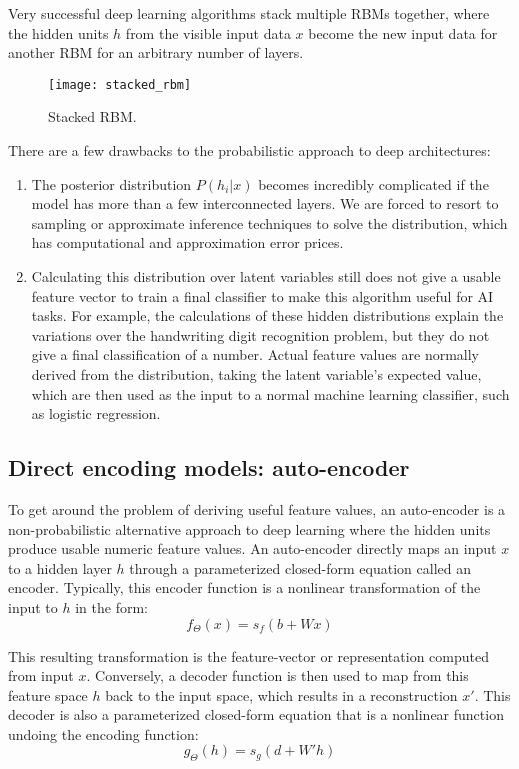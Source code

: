 Very successful deep learning algorithms stack multiple RBMs together, where the hidden units \(h\) from the visible input data \(x\) become the new input data for another RBM for an arbitrary number of layers. 

\begin{figure}[h!]
  \centering
    \texttt{[image: stacked\_rbm]}
\caption{Stacked RBM.}
\end{figure}



There are a few drawbacks to the probabilistic approach to deep architectures:
\begin{enumerate}
\item The posterior distribution \(P(h_i | x)\) becomes incredibly complicated if the model has more than a few interconnected layers. We are forced to resort to sampling or approximate inference techniques to solve the distribution, which has computational and approximation error prices.
\item Calculating this distribution over latent variables still does not give a usable feature vector to train a final classifier to make this algorithm useful for AI tasks. For example, the calculations of these hidden distributions explain the variations over the handwriting digit recognition problem, but they do not give a final classification of a number. Actual feature values are normally derived from the distribution, taking the latent variable's expected value, which are then used as the input to a normal machine learning classifier, such as logistic regression.
\end{enumerate}

\subsection{Direct encoding models: auto-encoder}
To get around the problem of deriving useful feature values, an auto-encoder is a non-probabilistic alternative approach to deep learning where the hidden units produce usable numeric feature values. An auto-encoder directly maps an input \(x\) to a hidden layer \(h\) through a parameterized closed-form equation called an encoder. Typically, this encoder function is a nonlinear transformation of the input to \(h\) in the form:
\[f_\Theta (x) = s_f (b + Wx)\]

This resulting transformation is the feature-vector or representation computed from input \(x\).
Conversely, a decoder function is then used to map from this feature space \(h\) back to the input space, which results in a reconstruction \(x'\). This decoder is also a parameterized closed-form equation that is a nonlinear function undoing the encoding function:
\[g_\Theta (h) = s_g (d + W' h)\]

